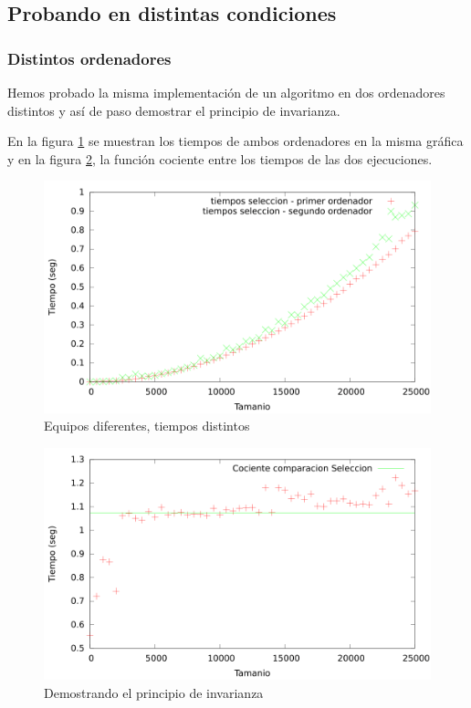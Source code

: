 \documentclass{article}
\begin{document}
\subsection{Probando en distintas condiciones}
\subsubsection{Distintos ordenadores}
Hemos probado la misma implementación de un algoritmo en dos ordenadores distintos y así de paso demostrar el principio de invarianza.
\

En la figura \ref{fig:compSeleccion} se muestran los tiempos de ambos ordenadores en la misma gráfica y en la figura \ref{fig:compSeleccion_cociente}, la función cociente entre los tiempos de las dos ejecuciones.
\begin{figure}[H]
	\centering
	\includegraphics[totalheight=8cm]{img/compSeleccion}
	\caption{Equipos diferentes, tiempos distintos}
	\label{fig:compSeleccion}
\end{figure}
\begin{figure}[H]
	\centering
	\includegraphics[totalheight=8cm]{img/compSeleccion_cociente}
	\caption{Demostrando el principio de invarianza}
	\label{fig:compSeleccion_cociente}
\end{figure}
\end{document}

